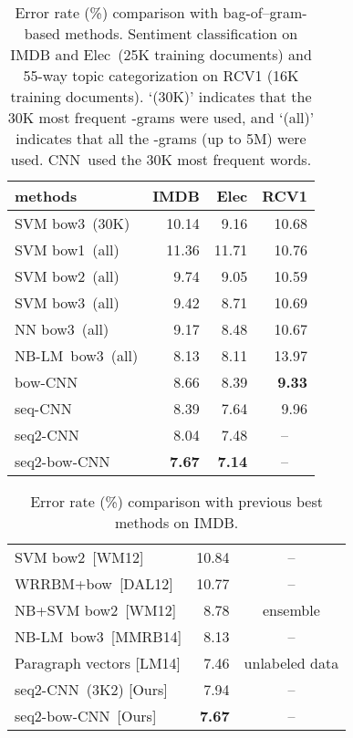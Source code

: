 \documentclass[11pt,letterpaper]{article}
\newcommand{\cnn}{CNN}
\newcommand{\scnn}{seq-CNN}
\newcommand{\sscnn}{seq2-CNN}
\newcommand{\ssbcnn}{seq2-bow-CNN}
\newcommand{\bcnn}{bow-CNN}
\newcommand{\bow}{{bow}}
\newcommand{\bowone}{{bow1}}
\newcommand{\bowtwo}{{bow2}}
\newcommand{\bowthree}{{bow3}}
\newcommand{\Elec}{Elec}
\newcommand{\nbw}{NB-LM}
\begin{document}
\begin{table}
\begin{center}
\begin{small}
\begin{tabular}{|l|r|r|r|} 
\hline
methods        & IMDB  & Elec  &  RCV1 \\  \hline
SVM \bowthree\ (30K)& 10.14 &  9.16 & 10.68 \\ \hline
SVM \bowone\ (all)  &    11.36 &    11.71 &     10.76 \\ 
SVM \bowtwo\ (all)  &     9.74 &     9.05 &     10.59 \\ 
SVM \bowthree\ (all)&     9.42 &     8.71 &     10.69 \\
\hline
NN \bowthree\ (all) &     9.17 &     8.48 &     10.67 \\ \hline
\nbw\ \bowthree\ (all)&     8.13 &     8.11 &     13.97 \\ \hline \hline
\bcnn\      &     8.66 &     8.39 &{\bf 9.33}\\ 
\scnn\      &     8.39 &     7.64 &     9.96 \\ 
\hline
\sscnn\     &     8.04 &     7.48 &\multicolumn{1}{|c|}{--}\\
\ssbcnn\    &{\bf 7.67}&{\bf 7.14}&\multicolumn{1}{|c|}{--}\\
\hline
\end{tabular}
\end{small}
\vspace{-0.1in}
\caption{ \label{tab:all} \small
Error rate (\%) 
comparison with bag-of--gram-based methods.
Sentiment classification on IMDB and \Elec\
(25K training documents) 
and 55-way topic categorization on RCV1 (16K training documents).  
`(30K)' indicates that the 30K most frequent -grams were used, 
and `(all)' indicates that all the -grams (up to 5M) were used.  
\cnn\ used the 30K most frequent words.  
}
\end{center}
\end{table}


\begin{table}
\begin{center}
\begin{small}
\begin{tabular}{|l|r|c|} 
\hline
SVM \bowtwo\ [WM12]    & 10.84 & -- \\
WRRBM+\bow\ [DAL12]    & 10.77 & -- \\
NB+SVM \bowtwo\ [WM12] & 8.78  & ensemble\\
\nbw\ \bowthree\ [MMRB14]& 8.13  & -- \\
\hline
Paragraph vectors [LM14] & 7.46 & unlabeled data\\
\hline  
\sscnn\ (3K2) [Ours]  &     7.94  & -- \\   
\ssbcnn\ [Ours] &{\bf 7.67} & -- \\
\hline
\end{tabular}
\end{small}
\end{center}
\vspace{-0.2in}
\caption{ \label{tab:imdb-prev} \small
Error rate (\%) comparison with previous best methods 
on IMDB. 
}
\end{table}
\end{document}
